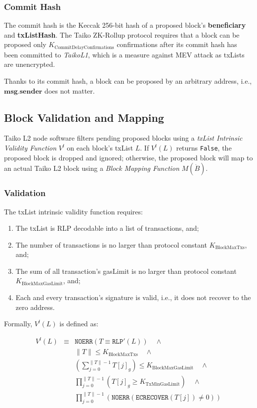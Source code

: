 \documentclass[9pt,oneside]{amsart}
\begin{document}
\begin{multicols}{2}
\subsubsection{Commit Hash} The commit hash is the Keccak 256-bit hash of a proposed block's \textbf{beneficiary} and \textbf{txListHash}. The Taiko ZK-Rollup protocol requires that a block can be proposed only $K_{\mathrm{CommitDelayConfirmations}}$ confirmations after its commit hash has been committed to  \textit{TaikoL1}, which is a measure against MEV attack\cite{mevethfoundation} as  txLists are unencrypted.

Thanks to its commit hash, a block can be proposed by an arbitrary address, i.e., $\mathbf{msg.sender}$ does not matter.

\subsection{Block Validation and Mapping } \label{sec:filtermap}
Taiko L2 node software filters pending proposed blocks using a \textit{txList Intrinsic Validity Function} $V^l$ on each block's txList $L$. If $V^l(L)$ returns \texttt{False}, the proposed block is dropped and ignored; otherwise, the proposed block will map to an actual Taiko L2 block using a \textit{Block Mapping Function} $M(\dot{B})$.

\subsubsection{Validation} The txList intrinsic validity function requires:

\begin{enumerate}
\item The txList is RLP decodable into a list of transactions, and;
\item The number of transactions is no larger than  protocol constant $ K_{\mathrm{BlockMaxTxs}}$, and;
\item The sum of all transaction's gasLimit is no larger than protocol constant $K_{\mathrm{BlockMaxGasLimit}}$, and;
\item Each and every transaction's signature is valid, i.e., it does not recover to the zero address.
\end{enumerate}

Formally, $V^l(L)$ is defined as:


\begin{eqnarray}
V^l(L) & \equiv & \texttt{NOERR}(T \equiv \texttt{RLP}'(L))  \quad \wedge  \\
\nonumber& & \lVert T \rVert \le K_{\mathrm{BlockMaxTxs}} \quad \wedge \\
\nonumber & & (\sum_{j = 0}^{\lVert T \rVert - 1}T[j]_g) \le K_{\mathrm{BlockMaxGasLimit}} \quad \wedge \\
\nonumber & & \prod_{j = 0}^{\lVert T \rVert - 1} (T[j]_g \ge K_{\mathrm{TxMinGasLimit}})\quad \wedge \\
\nonumber & & \prod_{j = 0}^{\lVert T \rVert - 1} (\texttt{NOERR}(\texttt{ECRECOVER}(T[j]) \ne 0) )
\end{eqnarray}


\end{multicols}
\end{document}
